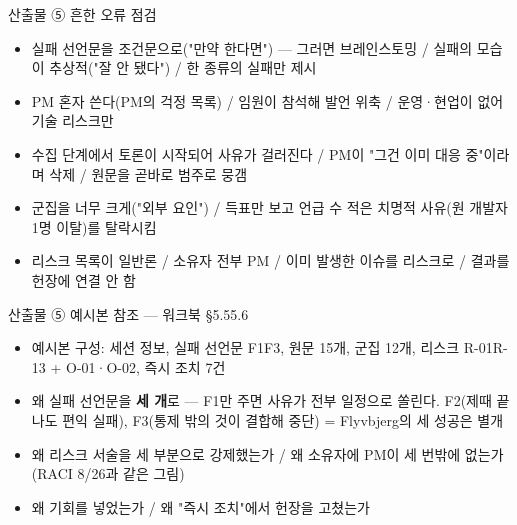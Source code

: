 \begin{frame}{산출물 ⑤ 흔한 오류 점검}
\begin{itemize}
\item 실패 선언문을 조건문으로("만약 \til{}한다면") — 그러면 브레인스토밍 / 실패의 모습이 추상적("잘 안 됐다") / 한 종류의 실패만 제시
\item PM 혼자 쓴다(PM의 걱정 목록) / 임원이 참석해 발언 위축 / 운영·현업이 없어 기술 리스크만
\item 수집 단계에서 토론이 시작되어 사유가 걸러진다 / PM이 "그건 이미 대응 중"이라며 삭제 / 원문을 곧바로 범주로 뭉갬
\item 군집을 너무 크게("외부 요인") / 득표만 보고 언급 수 적은 치명적 사유(원 개발자 1명 이탈)를 탈락시킴
\item 리스크 목록이 일반론 / 소유자 전부 PM / 이미 발생한 이슈를 리스크로 / 결과를 헌장에 연결 안 함
\end{itemize}
\end{frame}

\begin{frame}{산출물 ⑤ 예시본 참조 — 워크북 §5.5\til{}5.6}
\begin{itemize}
\item 예시본 구성: 세션 정보, 실패 선언문 F1\til{}F3, 원문 15개, 군집 12개, 리스크 R-01\til{}R-13 + O-01·O-02, 즉시 조치 7건
\item 왜 실패 선언문을 \textbf{세 개}로 — F1만 주면 사유가 전부 일정으로 쏠린다. F2(제때 끝나도 편익 실패), F3(통제 밖의 것이 결합해 중단) = Flyvbjerg의 세 성공은 별개
\item 왜 리스크 서술을 세 부분으로 강제했는가 / 왜 소유자에 PM이 세 번밖에 없는가(RACI 8/26과 같은 그림)
\item 왜 기회를 넣었는가 / 왜 "즉시 조치"에서 헌장을 고쳤는가
\end{itemize}
\end{frame}

